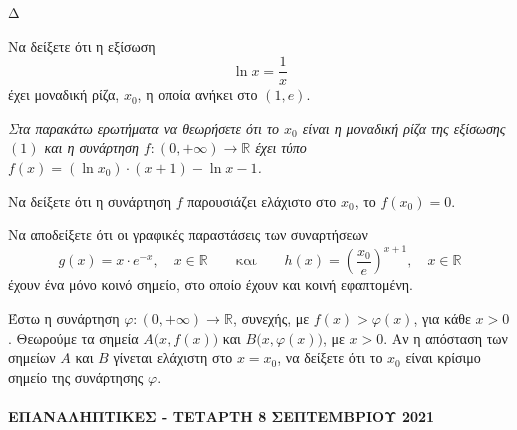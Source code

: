 \begin{thema}{Δ}
\begin{erwthma}
    \item Να δείξετε ότι η εξίσωση
    \[
    \ln x = \frac{1}{x} \tag{1}
    \]
    έχει μοναδική ρίζα, $x_0$, η οποία ανήκει στο $(1, e)$. 

    \item[\phantom{Δ0.}] \textit{Στα παρακάτω ερωτήματα να θεωρήσετε ότι το $x_0$ είναι η μοναδική ρίζα της εξίσωσης $(1)$ και η συνάρτηση $f: (0, +\infty) \to \mathbb{R}$ έχει τύπο $f(x) = (\ln x_0) \cdot (x+1) - \ln x - 1$.}

    \item Να δείξετε ότι η συνάρτηση $f$ παρουσιάζει ελάχιστο στο $x_0$, το $f(x_0) = 0$. 

    \item Να αποδείξετε ότι οι γραφικές παραστάσεις των συναρτήσεων
    \[
    g(x) = x \cdot e^{-x}, \quad x \in \mathbb{R} \qquad \text{και} \qquad h(x) = \left(\frac{x_0}{e}\right)^{x+1}, \quad x \in \mathbb{R}
    \]
    έχουν ένα μόνο κοινό σημείο, στο οποίο έχουν και κοινή εφαπτομένη. 

    \item Έστω η συνάρτηση $\varphi: (0, +\infty) \to \mathbb{R}$, συνεχής, με $f(x) > \varphi(x)$, για κάθε $x > 0$. Θεωρούμε τα σημεία $A\bigl(x, f(x)\bigr)$ και $B\bigl(x, \varphi(x)\bigr)$, με $x > 0$. Αν η απόσταση των σημείων $A$ και $B$ γίνεται ελάχιστη στο $x = x_0$, να δείξετε ότι το $x_0$ είναι κρίσιμο σημείο της συνάρτησης $\varphi$. 
\end{erwthma}
\end{thema}

\paragraph{ΕΠΑΝΑΛΗΠΤΙΚΕΣ - ΤΕΤΑΡΤΗ 8 ΣΕΠΤΕΜΒΡΙΟΥ 2021}

